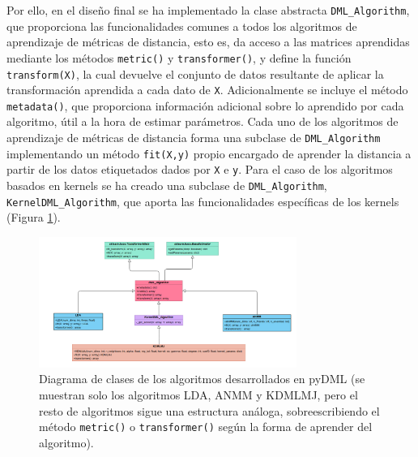 Por ello, en el diseño final se ha implementado la clase abstracta \texttt{DML\_Algorithm}, que proporciona las funcionalidades comunes a todos los algoritmos de aprendizaje de métricas de distancia, esto es, da acceso a las matrices aprendidas mediante los métodos \texttt{metric()} y \texttt{transformer()}, y define la función \texttt{transform(X)}, la cual devuelve el conjunto de datos resultante de aplicar la transformación aprendida a cada dato de \texttt{X}. Adicionalmente se incluye el método \texttt{metadata()}, que proporciona información adicional sobre lo aprendido por cada algoritmo, útil a la hora de estimar parámetros. Cada uno de los algoritmos de aprendizaje de métricas de distancia forma una subclase de \texttt{DML\_Algorithm} implementando un método \texttt{fit(X,y)} propio encargado de aprender la distancia a partir de los datos etiquetados dados por \texttt{X} e \texttt{y}. Para el caso de los algoritmos basados en kernels se ha creado una subclase de \texttt{DML\_Algorithm}, \texttt{KernelDML\_Algorithm}, que aporta las funcionalidades específicas de los kernels (Figura \ref{fig:diag_clases_pyDML}). 

\begin{figure} 
    \centering
    \includegraphics[width=0.75\textwidth]{images/uml_pydml.png}
    \caption{Diagrama de clases de los algoritmos desarrollados en pyDML (se muestran solo los algoritmos LDA, ANMM y KDMLMJ, pero el resto de algoritmos sigue una estructura análoga, sobreescribiendo el método \texttt{metric()} o \texttt{transformer()} según la forma de aprender del algoritmo).} \label{fig:diag_clases_pyDML}
\end{figure}

